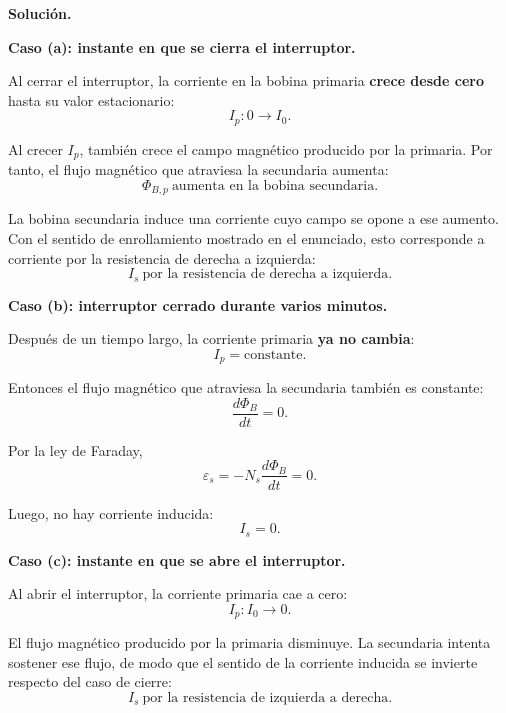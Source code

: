 \documentclass[11pt]{article}
\newcommand{\soluciontitulo}{%
  \par\medskip
  \noindent\textbf{Solución.}\par
  \smallskip
}
\newcommand{\paso}[1]{%
  \par\medskip
  \noindent\textbf{#1}\par
  \vspace{0.1em}%
}
\begin{document}
\soluciontitulo

\paso{Caso (a): instante en que se cierra el interruptor.}
Al cerrar el interruptor, la corriente en la bobina primaria \textbf{crece desde cero} hasta su valor estacionario:
\begin{equation*}
    I_p:0\longrightarrow I_0.
\end{equation*}

Al crecer $I_p$, tambi\'en crece el campo magn\'etico producido por la primaria. Por tanto, el flujo magn\'etico que atraviesa la secundaria aumenta:
\begin{equation*}
    \Phi_{B,p}\ \text{aumenta en la bobina secundaria}.
\end{equation*}

La bobina secundaria induce una corriente cuyo campo se opone a ese aumento. Con el sentido de enrollamiento mostrado en el enunciado, esto corresponde a corriente por la resistencia de derecha a izquierda:
\begin{equation*}
    \boxed{I_s\ \text{por la resistencia de derecha a izquierda}.}
\end{equation*}

\paso{Caso (b): interruptor cerrado durante varios minutos.}
Despu\'es de un tiempo largo, la corriente primaria \textbf{ya no cambia}:
\begin{equation*}
    I_p=\text{constante}.
\end{equation*}

Entonces el flujo magn\'etico que atraviesa la secundaria tambi\'en es constante:
\begin{equation*}
    \frac{d\Phi_B}{dt}=0.
\end{equation*}

Por la ley de Faraday,
\begin{equation*}
    \varepsilon_s=-N_s\frac{d\Phi_B}{dt}=0.
\end{equation*}

Luego, no hay corriente inducida:
\begin{equation*}
    \boxed{I_s=0.}
\end{equation*}

\paso{Caso (c): instante en que se abre el interruptor.}
Al abrir el interruptor, la corriente primaria cae a cero:
\begin{equation*}
    I_p:I_0\longrightarrow 0.
\end{equation*}

El flujo magn\'etico producido por la primaria disminuye. La secundaria intenta sostener ese flujo, de modo que el sentido de la corriente inducida se invierte respecto del caso de cierre:
\begin{equation*}
    \boxed{I_s\ \text{por la resistencia de izquierda a derecha}.}
\end{equation*}
\end{document}
